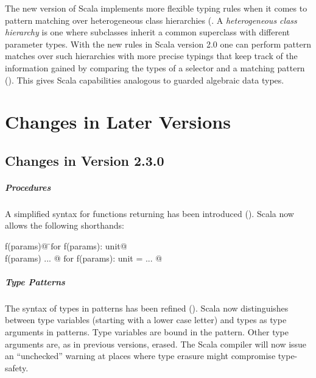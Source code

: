 The new version of Scala implements more flexible typing rules when it
comes to pattern matching over heterogeneous class hierarchies
(. A {\em heterogeneous class hierarchy} is
one where subclasses inherit a common superclass with different
parameter types.  With the new rules in Scala version 2.0 one can
perform pattern matches over such hierarchies with more precise
typings that keep track of the information gained by comparing the
types of a selector and a matching pattern ().
This gives Scala capabilities analogous to guarded algebraic data types.

\chapter{Changes in Later Versions}

\section{Changes in Version 2.3.0}

\paragraph{Procedures} A simplified syntax for functions returning
\lstinline@unit@ has been introduced (). 
Scala now allows the following shorthands:

\begin{tabbing}
\lstinline@def f(params)@     \tab\tab\tab \=$\mbox{for}$  \tab
\lstinline@def f(params): unit@ \\
\lstinline@def f(params) { ... }@  \>$\mbox{for}$    \tab
\lstinline@def f(params): unit = { ... }@
\end{tabbing}

\paragraph{Type Patterns} The syntax of types in patterns has been 
refined (). Scala now distinguishes between
type variables (starting with a lower case letter) and types as type
arguments in patterns.  Type variables are bound in the pattern. Other
type arguments are, as in previous versions, erased. The Scala
compiler will now issue an ``unchecked'' warning at places where type
erasure might compromise type-safety.





